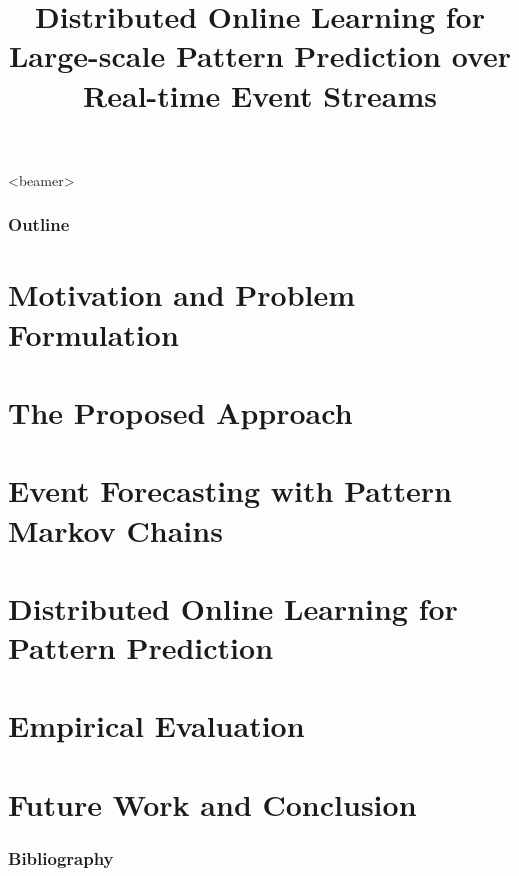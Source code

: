 \documentclass{beamer}
\title{	Distributed Online Learning for Large-scale Pattern Prediction over Real-time Event Streams}
\begin{document}



	\begin{frame}<beamer>
		\frametitle{Outline}
		\tableofcontents
	\end{frame}


\section{Motivation and Problem Formulation}

\section{The Proposed Approach}

\section{Event Forecasting with Pattern Markov Chains}

\section{Distributed Online Learning for Pattern Prediction}

\section{Empirical Evaluation}

\section{Future Work and Conclusion}




\begin{frame}[allowframebreaks]
	\frametitle{Bibliography}
	 
	
	
\end{frame}
\end{document}
